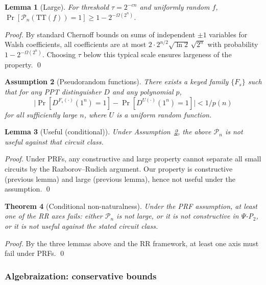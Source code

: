 \documentclass[11pt]{article}
\newtheorem{theorem}{Theorem}[section]
\newtheorem{lemma}[theorem]{Lemma}
\newtheorem{assumption}[theorem]{Assumption}
\theoremstyle{definition}
\newcommand{\PSi}{\Psi}
\begin{document}
\begin{lemma}[Large]
For threshold $\tau = 2^{-c n}$ and uniformly random $f$, $\Pr[\mathcal{P}_n(\mathrm{TT}(f))=1]\ge 1-2^{-\Omega(2^n)}$.
\end{lemma}
\begin{proof}
By standard Chernoff bounds on sums of independent $\pm1$ variables for Walsh coefficients, all coefficients are at most $2\cdot 2^{n/2}\sqrt{\ln 2}\,\sqrt{2^n}$ with probability $1-2^{-\Omega(2^n)}$. Choosing $\tau$ below this typical scale ensures largeness of the property. \qed
\end{proof}

\begin{assumption}[Pseudorandom functions]
\label{asm:prf}
There exists a keyed family $\{F_s\}$ such that for any PPT distinguisher $D$ and any polynomial $p$, 
\[
\big|\Pr[D^{F_s(\cdot)}(1^n)=1]-\Pr[D^{U(\cdot)}(1^n)=1]\big|<1/p(n)
\]
for all sufficiently large $n$, where $U$ is a uniform random function.
\end{assumption}

\begin{lemma}[Useful (conditional)]
Under Assumption~\ref{asm:prf}, the above $\mathcal{P}_n$ is not useful against that circuit class.
\end{lemma}
\begin{proof}
Under PRFs, any constructive and large property cannot separate all small circuits by the Razborov--Rudich argument. Our property is constructive (previous lemma) and large (previous lemma), hence not useful under the assumption. \qed
\end{proof}

\begin{theorem}[Conditional non-naturalness]
Under the PRF assumption, at least one of the RR axes fails: either $\mathcal{P}_n$ is not large, or it is not constructive in $\PSi$-P$_2$, or it is not useful against the stated circuit class.
\end{theorem}
\begin{proof}
By the three lemmas above and the RR framework, at least one axis must fail under PRFs. \qed
\end{proof}

\subsubsection{Algebraization: conservative bounds}
\label{sec:algebraization}
\end{document}
